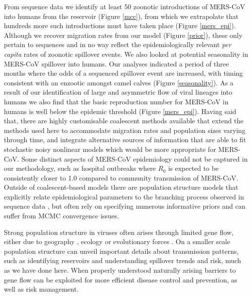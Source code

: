 \documentclass[9pt,lineno]{elife}
\begin{document}
From sequence data we identify at least 50 zoonotic introductions of MERS-CoV into humans from the reservoir (Figure \ref{mcc}), from which we extrapolate that hundreds more such introductions must have taken place (Figure \ref{mers_epi}).
Although we recover migration rates from our model (Figure \ref{prior}), these only pertain to sequences and in no way reflect the epidemiologically relevant \textit{per capita} rates of zoonotic spillover events.
We also looked at potential seasonality in MERS-CoV spillover into humans.
Our analyses indicated a period of three months where the odds of a sequenced spillover event are increased, with timing consistent with an enzootic amongst camel calves (Figure \ref{seasonality}).
As a result of our identification of large and asymmetric flow of viral lineages into humans we also find that the basic reproduction number for MERS-CoV in humans is well below the epidemic threshold (Figure \ref{mers_epi}).
Having said that, there are highly customisable coalescent methods available that extend the methods used here to accommodate migration rates and population sizes varying through time, and integrate alternative sources of information that are able to fit stochastic noisy nonlinear models \citep{rasmussen_phylodynamic_2014} which would be more appropriate for MERS-CoV.
Some distinct aspects of MERS-CoV epidemiology could not be captured in our methodology, such as hospital outbreaks where $R_{0}$ is expected to be consistently closer to 1.0 compared to community transmission of MERS-CoV.
Outside of coalescent-based models there are population structure models that explicitly relate epidemiological parameters to the branching process observed in sequence data \citep{kuhnert_phylodynamics_2016}, but often rely on specifying numerous informative priors and can suffer from MCMC convergence issues.

Strong population structure in viruses often arises through limited gene flow, either due to geography \citep{dudas_virus_2017}, ecology \citep{smith_dating_2009} or evolutionary forces \citep{turner_genomic_2005,dudas_reassortment_2015}.
On a smaller scale population structure can unveil important details about transmission patterns, such as identifying reservoirs and understanding spillover trends and risk, much as we have done here.
When properly understood naturally arising barriers to gene flow can be exploited for more efficient disease control and prevention, as well as risk management.
\end{document}

